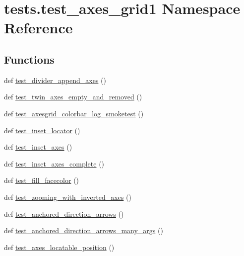 \hypertarget{namespacetests_1_1test__axes__grid1}{}\section{tests.\+test\+\_\+axes\+\_\+grid1 Namespace Reference}
\label{namespacetests_1_1test__axes__grid1}
\subsection*{Functions}
\begin{DoxyCompactItemize}
\item 
def \hyperlink{namespacetests_1_1test__axes__grid1_a56f738d0d95e4b0d8ea37f28a2c60783}{test\+\_\+divider\+\_\+append\+\_\+axes} ()
\item 
def \hyperlink{namespacetests_1_1test__axes__grid1_aa7c3455f23586e9cdeef44885a93831a}{test\+\_\+twin\+\_\+axes\+\_\+empty\+\_\+and\+\_\+removed} ()
\item 
def \hyperlink{namespacetests_1_1test__axes__grid1_ae74de1b3ce4cc139bd0e98002de33b4d}{test\+\_\+axesgrid\+\_\+colorbar\+\_\+log\+\_\+smoketest} ()
\item 
def \hyperlink{namespacetests_1_1test__axes__grid1_a4737df3987b3194a83fc8353726689f1}{test\+\_\+inset\+\_\+locator} ()
\item 
def \hyperlink{namespacetests_1_1test__axes__grid1_a6d3828f6acaf24eb96ba4be811950db1}{test\+\_\+inset\+\_\+axes} ()
\item 
def \hyperlink{namespacetests_1_1test__axes__grid1_a44c2d67b204c20b82ad2d4e37d3947ec}{test\+\_\+inset\+\_\+axes\+\_\+complete} ()
\item 
def \hyperlink{namespacetests_1_1test__axes__grid1_a840065d9120aab20ba5b06ebc6fbf50f}{test\+\_\+fill\+\_\+facecolor} ()
\item 
def \hyperlink{namespacetests_1_1test__axes__grid1_a8ed68f716f7d550c62a802f44a7d60be}{test\+\_\+zooming\+\_\+with\+\_\+inverted\+\_\+axes} ()
\item 
def \hyperlink{namespacetests_1_1test__axes__grid1_aef358e2620eb54c402d98f0a5df6b7a6}{test\+\_\+anchored\+\_\+direction\+\_\+arrows} ()
\item 
def \hyperlink{namespacetests_1_1test__axes__grid1_a9f6717034fcce8f54b6a0a9bad05af68}{test\+\_\+anchored\+\_\+direction\+\_\+arrows\+\_\+many\+\_\+args} ()
\item 
def \hyperlink{namespacetests_1_1test__axes__grid1_a18e369d2027291f0753fc6e9b3f8e507}{test\+\_\+axes\+\_\+locatable\+\_\+position} ()

\end{DoxyCompactItemize}
